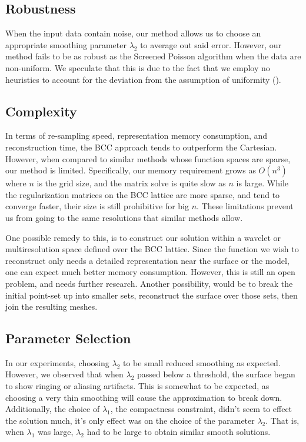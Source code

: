 \subsection{Robustness}
When the input data contain noise, our method allows us to choose an appropriate smoothing parameter $\lambda_2$ to average out said error. 
However, our method fails to be as robust as the Screened Poisson algorithm when the data are non-uniform. 
We speculate that this is due to the fact that we employ no heuristics to account for the deviation from the assumption of uniformity ().

\subsection{Complexity}
In terms of re-sampling speed, representation memory consumption, and reconstruction time, the BCC approach tends to outperform the Cartesian. 
However, when compared to similar methods whose function spaces are sparse, our method is limited. 
Specifically, our memory requirement grows as $O(n^3)$ where $n$ is the grid size, and the matrix solve is quite slow as $n$ is large. 
While the regularization matrices on the BCC lattice are more sparse, and tend to converge faster, their size is still prohibitive for big $n$. 
These limitations prevent us from going to the same resolutions that similar methods allow.

One possible remedy to this, is to construct our solution within a wavelet or multiresolution space defined over the BCC lattice. 
Since the function we wish to reconstruct only needs a detailed representation near the surface or the model, one can expect much better memory consumption. 
However, this is still an open problem, and needs further research. 
Another possibility, would be to break the initial point-set up into smaller sets, reconstruct the surface over those sets, then join the resulting meshes. 

\subsection{Parameter Selection}
In our experiments, choosing $\lambda_2$ to be small reduced smoothing as expected. 
However, we observed that when $\lambda_2$ passed below a threshold, the surface began to show ringing or aliasing artifacts. 
This is somewhat to be expected, as choosing a very thin smoothing will cause the approximation  to break down. 
Additionally, the choice of $\lambda_1$, the compactness constraint, didn't seem to effect the solution much, it's only effect was on the choice of the parameter $\lambda_2$. 
That is, when $\lambda_1$ was large, $\lambda_2$ had to be large to obtain similar smooth solutions.

